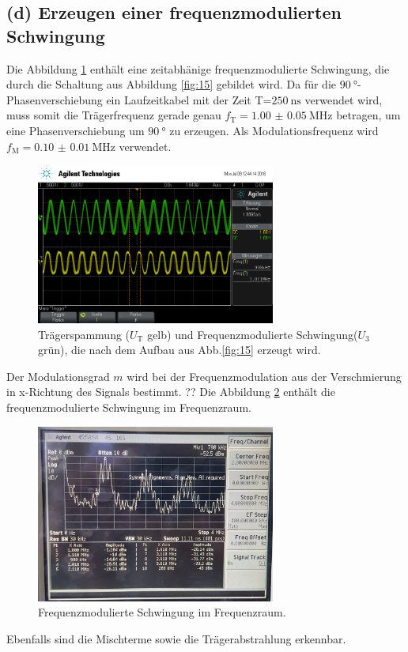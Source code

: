 \subsection{(d) Erzeugen einer frequenzmodulierten Schwingung}
\label{subsec:auswertung_d}
Die Abbildung \ref{fig:freq_zeit} enthält eine zeitabhänige frequenzmodulierte
Schwingung, die durch die Schaltung aus Abbildung \ref{fig:15}
gebildet wird.
Da für die  $\SI{90}{\degree}$-Phasenverschiebung ein Laufzeitkabel mit der
Zeit T=$\SI{250}{\nano\second}$ verwendet wird, muss somit die
Trägerfrequenz gerade genau $f_{\text{T}}=\SI{1.00(5)}{\mega\hertz}$
betragen, um eine Phasenverschiebung um $\SI{90}{\degree}$
zu erzeugen. Als Modulationsfrequenz wird
$f_{\text{M}}=\SI{0.10(1)}{\mega\hertz}$ verwendet.

\begin{figure}
  \centering
  \includegraphics[width=0.7\textwidth]{osci/freq_mod.png}
  \caption{Trägerspammung ($U_{\text{T}}$ gelb) und Frequenzmodulierte
  Schwingung($U_3$ grün), die nach dem Aufbau aus Abb.\ref{fig:15} erzeugt wird.}
  \label{fig:freq_zeit}
\end{figure}
Der Modulationsgrad $m$ wird bei der Frequenzmodulation
aus der Verschmierung in x-Richtung des Signals bestimmt.
??
Die Abbildung \ref{fig:frequenz_freq} enthält die frequenzmodulierte Schwingung
im Frequenzraum.
\begin{figure}
  \centering
  \includegraphics[width=0.7\textwidth]{spec/frequenzmodulation_bereich_fresh_cool.jpg}
  \caption{Frequenzmodulierte
Schwingung im Frequenzraum.}
\label{fig:frequenz_freq}
\end{figure}
Ebenfalls sind die Mischterme sowie die Trägerabstrahlung erkennbar.



